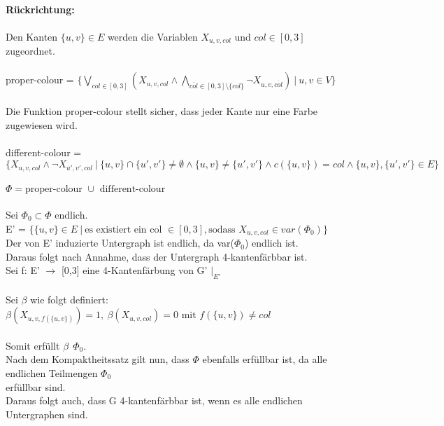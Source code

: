 \documentclass[a4paper,10pt]{article}
\begin{document}
	\ \\ \textbf{Rückrichtung:} \\
	\\
	Den Kanten $\{ u,v \} \in E$ werden die Variablen $X_{u,v,col}$ und $col \in [0,3]$ zugeordnet.\\
	\\
	proper-colour = 
	\( \{ \bigvee\limits_{col \in [0,3]} (X_{u,v,col} \wedge \bigwedge\limits_{\overline{col} \in [0,3]\setminus{ \{ col \} } } 
	\neg X_{u,v,\overline{col}})~|~u,v \in V \} \) \\	
	\\
	Die Funktion proper-colour stellt sicher, dass jeder Kante nur eine Farbe zugewiesen wird.\\
	\\
	different-colour = \\
	\( \{ X_{u,v,col} \wedge \neg X_{u',v',col}~|~
	\{ u,v \} \cap \{ u',v' \} \neq \emptyset \wedge 
	\{ u,v \} \neq \{ u',v' \} \wedge 
	c(\{ u,v \}) = col \wedge 
	\{u,v\},\{u',v'\} \in E \} \) \\
	\\	
	\(\Phi = \text{proper-colour } \cup \text{ different-colour} \)\\
	\\
	Sei $\Phi_0 \subset \Phi$ endlich.\\
	E' = $\{ \{u,v\} \in E~|~\text{es existiert ein col } \in [0,3], \text{sodass } X_{u,v,col} \in var(\Phi_0) \}$ \\
	Der von E' induzierte Untergraph ist endlich, da var($\Phi_0$) endlich ist.\\
	Daraus folgt nach Annahme, dass der Untergraph 4-kantenfärbbar ist.\\
	Sei f: E' $\rightarrow$ [0,3] eine 4-Kantenfärbung von G' $|_{E'}$\\
	\\
	Sei $\beta$ wie folgt definiert: \\
	\(\beta(X_{u,v,f(\{ u,v \})}) = 1,~\beta(X_{u,v,col}) = 0 \text{ mit } f(\{ u,v \}) \neq col \) \\
	\\
	Somit erfüllt $\beta~~\Phi_0$.\\
	Nach dem Kompaktheitssatz gilt nun, dass $\Phi$ ebenfalls erfüllbar ist, da alle endlichen Teilmengen $\Phi_0$\\
	erfüllbar sind.\\
	Daraus folgt auch, dass G 4-kantenfärbbar ist, wenn es alle endlichen Untergraphen sind.\\	
	
\end{document}
